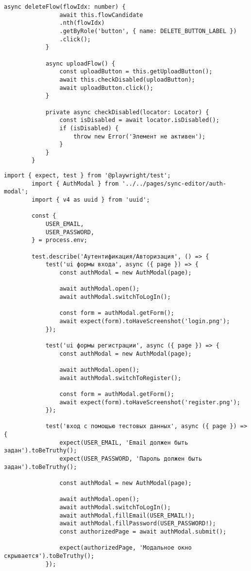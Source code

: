 \begin{lstlisting}[caption={pages/synchronizing-page.ts}]
			async deleteFlow(flowIdx: number) {
				await this.flowCandidate
				.nth(flowIdx)
				.getByRole('button', { name: DELETE_BUTTON_LABEL })
				.click();
			}
			
			async uploadFlow() {
				const uploadButton = this.getUploadButton();
				await this.checkDisabled(uploadButton);
				await uploadButton.click();
			}
			
			private async checkDisabled(locator: Locator) {
				const isDisabled = await locator.isDisabled();
				if (isDisabled) {
					throw new Error('Элемент не активен');
				}
			}
		}
	\end{lstlisting}

	\begin{lstlisting}[caption={tests/sync-editor/auth.spec.ts}]
		import { expect, test } from '@playwright/test';
		import { AuthModal } from '../../pages/sync-editor/auth-modal';
		import { v4 as uuid } from 'uuid';
		
		const {
			USER_EMAIL,
			USER_PASSWORD,
		} = process.env;
		
		test.describe('Аутентификация/Авторизация', () => {
			test('ui формы входа', async ({ page }) => {
				const authModal = new AuthModal(page);
				
				await authModal.open();
				await authModal.switchToLogIn();
				
				const form = authModal.getForm();
				await expect(form).toHaveScreenshot('login.png');
			});
			
			test('ui формы регистрации', async ({ page }) => {
				const authModal = new AuthModal(page);
				
				await authModal.open();
				await authModal.switchToRegister();
				
				const form = authModal.getForm();
				await expect(form).toHaveScreenshot('register.png');
			});
			
			test('вход с помощью тестовых данных', async ({ page }) => {
				expect(USER_EMAIL, 'Email должен быть задан').toBeTruthy();
				expect(USER_PASSWORD, 'Пароль должен быть задан').toBeTruthy();
				
				const authModal = new AuthModal(page);
				
				await authModal.open();
				await authModal.switchToLogIn();
				await authModal.fillEmail(USER_EMAIL!);
				await authModal.fillPassword(USER_PASSWORD!);
				const authorizedPage = await authModal.submit();
				
				expect(authorizedPage, 'Модальное окно скрывается').toBeTruthy();
			});
			

\end{lstlisting}
